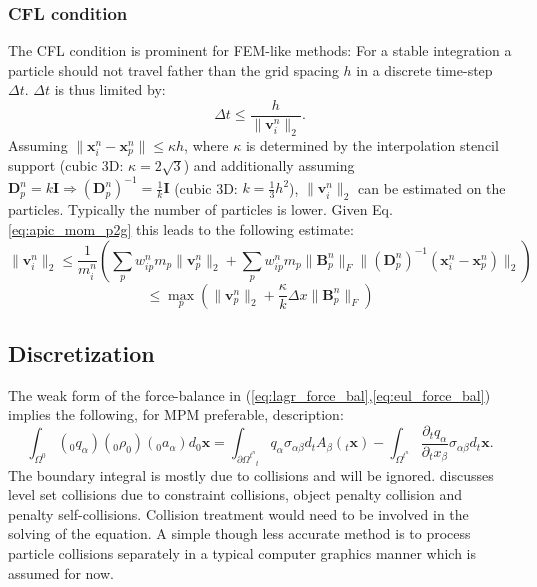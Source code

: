 \documentclass[m,times]{cgMA}
\begin{document}
\subsubsection{CFL condition} \label{sec:cfl}
The CFL condition is prominent for FEM-like methods: For a stable integration a particle should not travel father than the grid spacing $h$ in a discrete time-step $\Delta t$. $\Delta t$ is thus limited by:
\begin{equation}
  \Delta t \leq \frac{h}{\|\boldsymbol{v}^n_i\|_2}.
\end{equation}
Assuming $\|\boldsymbol{x}_i^n -\boldsymbol{x}_p^n\| \leq \kappa h$, where $\kappa$ is determined by the interpolation stencil support (cubic 3D: $\kappa = 2\sqrt{3}$) and additionally assuming $\boldsymbol{D}_p^n = k\boldsymbol{I} \Rightarrow (\boldsymbol{D}_p^n)^{-1} = \frac{1}{k}\boldsymbol{I}$ (cubic 3D: $k=\frac{1}{3}h^2$),
$\|\boldsymbol{v}^n_i\|_2$ can be estimated on the particles. Typically the number of particles is lower. Given Eq. \ref{eq:apic_mom_p2g} this leads to the following estimate:
$$
\|\boldsymbol{v}^n_i\|_2 \leq \frac{1}{m_i^n}\left(\sum _ { p } w _ { i p } ^ { n } m _ { p } \| \boldsymbol { v } _ { p } ^ { n } \|_2 + \sum _ { p } w _ { i p } ^ { n } m _ { p } \| \boldsymbol { B } _ { p } ^ { n } \| _ { F } \| ( \boldsymbol { D } _ { p } ^ { n } ) ^ { - 1 } ( \boldsymbol { x } _ { i } ^ { n } - \boldsymbol { x } _ { p } ^ { n } ) \|_2\right)
$$
\begin{equation}
\leq \max _ { p } ( \| \boldsymbol { v } _ { p } ^ { n } \|_2 + \frac { \kappa } { k } \Delta x \| \boldsymbol { B } _ { p } ^ { n } \| _ { F } )
\end{equation}
\cite{MPM:APIC}
\subsection{Discretization}\label{sec:discretization}
The weak form of the force-balance in (\ref{eq:lagr_force_bal},\ref{eq:eul_force_bal}) implies the following, for MPM preferable, description:
\begin{equation} \label{eq:weak_mpm}
  \int _ { \Omega ^ { 0 } } (_0q _ \alpha) (_0\rho_0) (_0a _\alpha)  d _0\boldsymbol{x}= \int _ { \partial \Omega ^ { t^n } } _tq _ \alpha \sigma _ {\alpha\beta} d_tA_\beta(_t\boldsymbol{x}) -  \int _ { \Omega ^ { t^n} } \frac{\partial _tq _ \alpha}{\partial _tx_\beta} \sigma _ {\alpha\beta} d_t\boldsymbol{x}.
\end{equation}
The boundary integral is mostly due to collisions and will be ignored. \cite{MPM:OPTIMI_INTEGR} discusses level set collisions due to constraint collisions, object penalty collision and penalty self-collisions. Collision treatment would need to be involved in the solving of the equation. A simple though less accurate method is to process particle collisions separately in a typical computer graphics manner which is assumed for now.
\end{document}
